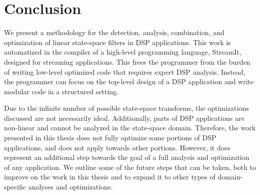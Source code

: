 \section{Conclusion}

    We present a methodology for the detection, analysis, combination, and
optimization of linear state-space filters in DSP applications.
This work is automatized in the compiler of a high-level
programming language, StreamIt, designed for streaming
applications. This frees the programmer from the burden of writing
low-level optimized code that requires expert DSP analysis.
Instead, the programmer can focus on the top-level design of a DSP
application and write modular code in a structured setting.

    Due to the infinite number of possible state-space transforms,
the optimizations discussed are not necessarily ideal.
Additionally, parts of DSP applications are non-linear and cannot
be analyzed in the state-space domain. Therefore, the work
presented in this thesis does not fully optimize some portions of
DSP applications, and does not apply towards other portions.
However, it does represent an additional step towards the goal of
a full analysis and optimization of any application. We outline
some of the future steps that can be taken, both to improve on the
work in this thesis and to expand it to other types of
domain-specific analyses and optimizations.
